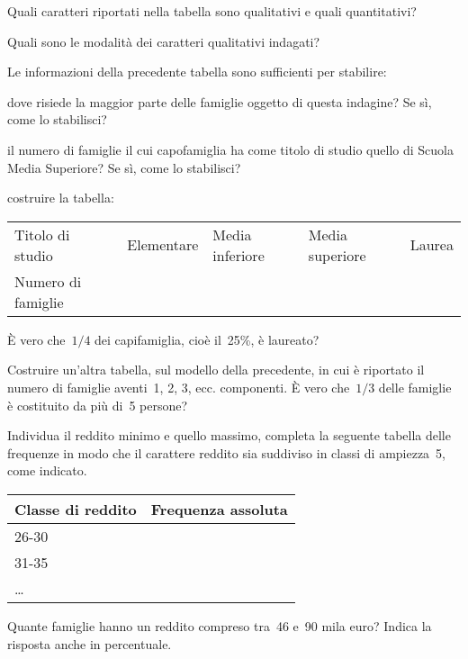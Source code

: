 \begin{esercizio}
\begin{itemize*}
\item Quali caratteri riportati nella tabella sono qualitativi e quali quantitativi?
\item Quali sono le modalità dei caratteri qualitativi indagati?
\item Le informazioni della precedente tabella sono sufficienti per stabilire:
\begin{itemize*}
\item dove risiede la maggior parte delle famiglie oggetto di questa indagine? Se sì, come lo stabilisci?
\item il numero di famiglie il cui capofamiglia ha come titolo di studio quello di Scuola Media Superiore? Se sì, come lo stabilisci?
\end{itemize*}
\item costruire la tabella:
\begin{center}
 \begin{tabular}{lllll}
\toprule
Titolo di studio & Elementare & Media inferiore & Media superiore & Laurea \\
Numero di famiglie & & & & \\
\bottomrule
\end{tabular}
\end{center}
\item \`E vero che~$1/4$ dei capifamiglia, cioè il~25\%, è laureato?
\item Costruire un'altra tabella, sul modello della precedente, in cui è riportato il numero di famiglie aventi~1, 2, 3, ecc. componenti.
\`E vero che~$1/3$ delle famiglie è costituito da più di~5 persone?
\item Individua il reddito minimo e quello massimo, completa la seguente tabella delle frequenze in modo che il carattere reddito
sia suddiviso in classi di ampiezza~5, come indicato.
\begin{center}
\begin{tabular}{ll}
\toprule
Classe di reddito & Frequenza assoluta \\
\midrule
26-30 &  \\
31-35 &  \\
\ldots   &  \\
\bottomrule
\end{tabular}
\end{center}
\item Quante famiglie hanno un reddito compreso tra~46 e~90 mila euro? Indica la risposta anche in percentuale.
\end{itemize*}
\end{esercizio}


